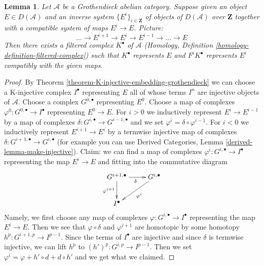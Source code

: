 \documentclass{stacks-project}
\theoremstyle{plain}
\newtheorem{lemma}[subsection]{Lemma}
\theoremstyle{definition}
\theoremstyle{remark}
\numberwithin{equation}{subsection}
\begin{document}
\begin{lemma}
\label{lemma-represent-by-filtered-complex}
Let $\mathcal{A}$ be a Grothendieck abelian category. Suppose given an object
$E \in D(\mathcal{A})$ and an inverse system $\{E^i\}_{i \in \mathbf{Z}}$
of objects of $D(\mathcal{A})$ over $\mathbf{Z}$ together with
a compatible system of maps $E^i \to E$. Picture:
$$
\ldots \to E^{i + 1} \to E^i \to E^{i - 1} \to \ldots \to E
$$
Then there exists a filtered complex $K^\bullet$ of $\mathcal{A}$
(Homology, Definition \ref{homology-definition-filtered-complex})
such that $K^\bullet$ represents $E$
and $F^iK^\bullet$ represents $E^i$ compatibly with the given maps.
\end{lemma}

\begin{proof}
By Theorem \ref{theorem-K-injective-embedding-grothendieck}
we can choose a K-injective complex $I^\bullet$
representing $E$ all of whose terms $I^n$ are injective
objects of $\mathcal{A}$.
Choose a complex $G^{0, \bullet}$ representing $E^0$.
Choose a map of complexes $\varphi^0 : G^{0, \bullet} \to I^\bullet$
representing $E^0 \to E$.
For $i > 0$ we inductively represent $E^i \to E^{i - 1}$
by a map of complexes
$\delta : G^{i, \bullet} \to G^{i - 1, \bullet}$
and we set $\varphi^i = \delta \circ \varphi^{i - 1}$.
For $i < 0$ we inductively represent $E^{i + 1} \to E^i$
by a termwise injective map of complexes
$\delta : G^{i + 1, \bullet} \to G^{i, \bullet}$
(for example you can use
Derived Categories, Lemma \ref{derived-lemma-make-injective}).
Claim: we can find a map of complexes
$\varphi^i : G^{i, \bullet} \to I^\bullet$
representing the map $E^i \to E$ and
fitting into the commutative diagram
$$
\xymatrix{
G^{i + 1, \bullet} \ar[r]_\delta \ar[d]_{\varphi^{i + 1}} &
G^{i, \bullet} \ar[ld]^{\varphi^i} \\
I^\bullet
}
$$
Namely, we first choose any map of complexes
$\varphi : G^{i, \bullet} \to I^\bullet$
representing the map
$E^i \to E$. Then we see that $\varphi \circ \delta$
and $\varphi^{i + 1}$ are homotopic by some homotopy
$h^p : G^{i + 1, p} \to I^{p - 1}$.
Since the terms of
$I^\bullet$ are injective and since $\delta$
is termwise injective, we can lift $h^p$ to
$(h')^p : G^{i, p} \to I^{p - 1}$.
Then we set $\varphi^i = \varphi + h' \circ d + d \circ h'$
and we get what we claimed.


\end{proof}
\end{document}

